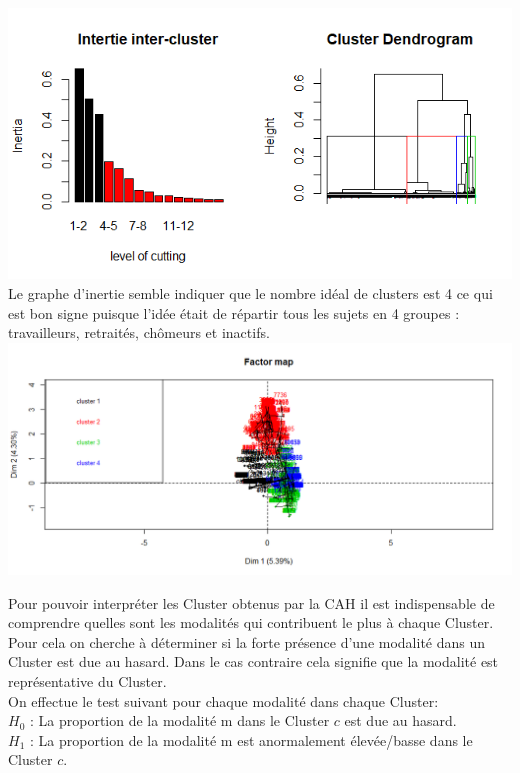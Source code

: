 \documentclass{book}
\begin{document}
\includegraphics[scale = 1]{dendro_inertie_cah.png}
\noindent
Le graphe d'inertie semble indiquer que le nombre idéal de clusters est 4 ce qui est bon signe puisque l'idée était de répartir tous les sujets en 4 groupes : travailleurs, retraités, chômeurs et inactifs.\\

\includegraphics[scale = .5]{cah_ind_cluster.png}

\noindent
Pour pouvoir interpréter les Cluster obtenus par la CAH il est indispensable de comprendre quelles sont les modalités qui contribuent le plus à chaque Cluster.\\
Pour cela on cherche à déterminer si la forte présence d'une modalité dans un Cluster est due au hasard. Dans le cas contraire cela signifie que la modalité est représentative du Cluster.\\

\noindent
On effectue le test suivant pour chaque modalité dans chaque Cluster:\\
\noindent 
$H_0$ : La proportion de la modalité m dans le Cluster $c$ est due au hasard.\\
\noindent
$H_1$ : La proportion de la modalité m est anormalement élevée/basse dans le Cluster $c$.\\
\end{document}
